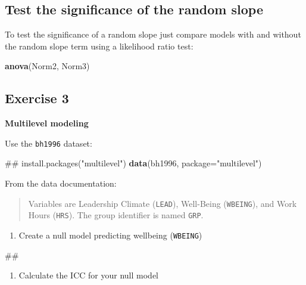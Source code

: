 \documentclass[]{book}
\newenvironment{Shaded}{\begin{snugshade}}{\end{snugshade}}
\newcommand{\KeywordTok}[1]{\textcolor[rgb]{0.13,0.29,0.53}{\textbf{#1}}}
\newcommand{\DataTypeTok}[1]{\textcolor[rgb]{0.13,0.29,0.53}{#1}}
\newcommand{\StringTok}[1]{\textcolor[rgb]{0.31,0.60,0.02}{#1}}
\newcommand{\NormalTok}[1]{#1}
\providecommand{\tightlist}{%
  \setlength{\itemsep}{0pt}\setlength{\parskip}{0pt}}
\begin{document}
\subsection{Test the significance of the random
slope}\label{test-the-significance-of-the-random-slope}

To test the significance of a random slope just compare models with and
without the random slope term using a likelihood ratio test:

\begin{Shaded}
\begin{Highlighting}[]
  \KeywordTok{anova}\NormalTok{(Norm2, Norm3) }
\end{Highlighting}
\end{Shaded}

\subsection{Exercise 3}\label{exercise-3-1}

\textbf{Multilevel modeling}

Use the \texttt{bh1996} dataset:

\begin{Shaded}
\begin{Highlighting}[]
\NormalTok{## install.packages("multilevel")}
\KeywordTok{data}\NormalTok{(bh1996, }\DataTypeTok{package=}\StringTok{"multilevel"}\NormalTok{)}
\end{Highlighting}
\end{Shaded}

From the data documentation:

\begin{quote}
Variables are Leadership Climate (\texttt{LEAD}), Well-Being
(\texttt{WBEING}), and Work Hours (\texttt{HRS}). The group identifier
is named \texttt{GRP}.
\end{quote}

\begin{enumerate}
\def\labelenumi{\arabic{enumi}.}
\tightlist
\item
  Create a null model predicting wellbeing (\texttt{WBEING})
\end{enumerate}

\begin{Shaded}
\begin{Highlighting}[]
\NormalTok{## }
\end{Highlighting}
\end{Shaded}

\begin{enumerate}
\def\labelenumi{\arabic{enumi}.}
\setcounter{enumi}{1}
\tightlist
\item
  Calculate the ICC for your null model
\end{enumerate}
\end{document}
